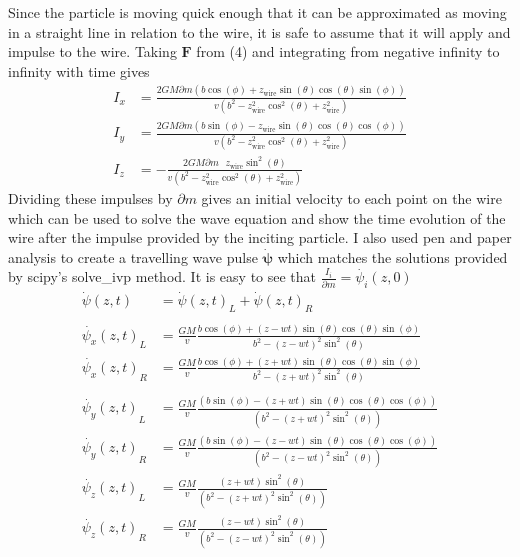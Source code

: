 \documentclass{report}
\begin{document}
Since the particle is moving quick enough that it can be approximated as moving in a straight line in relation
to the wire, it is safe to assume that it will apply and impulse to the wire. Taking $\mathbf{F}$ from (4) and 
integrating from negative infinity to infinity with time gives
\begin{align}
    I_x &= \frac{2 G M \partial m (b \cos (\phi )+z_{\text{wire}} \sin (\theta ) \cos (\theta ) \sin (\phi ))}{v \left(b^2-z_{\text{wire}}^2 \cos ^2(\theta )+z_{\text{wire}}^2\right)}\\
    I_y &= \frac{2 G M \partial m (b \sin (\phi )-z_{\text{wire}} \sin (\theta ) \cos (\theta ) \cos (\phi ))}{v \left(b^2-z_{\text{wire}}^2 \cos ^2(\theta )+z_{\text{wire}}^2\right)}\\
    I_z &= -\frac{2 G M \partial m \text{ } z_{\text{wire}} \sin ^2(\theta )}{v \left(b^2-z_{\text{wire}}^2 \cos ^2(\theta )+z_{\text{wire}}^2\right)}
\end{align}
Dividing these impulses by $\partial m$ gives an initial velocity to each point on the wire which can be used to 
solve the wave equation and show the time evolution of the wire after the impulse provided by the inciting particle.
I also used pen and paper analysis to create a travelling wave pulse $\dot{\mathbf{\psi}}$ which matches the solutions provided
by scipy's solve\_ivp method. It is easy to see that  $\frac{I_i}{\partial m} = \dot{\psi_i} (z, 0)$
\begin{align}
    \dot{\psi} (z, t) &= {\dot{\psi} (z, t)}_L + {\dot{\psi} (z, t)}_R\\
    \nonumber\\
    \nonumber {\dot{\psi_x} (z, t)}_L &= \frac{G M}{v} \frac{b \cos (\phi )+ (z - w t) \sin (\theta ) \cos (\theta ) \sin (\phi )}{b^2-{(z - w t)}^2 \sin ^2(\theta )}\\
    \nonumber {\dot{\psi_x} (z, t)}_R &= \frac{G M}{v} \frac{b \cos (\phi )+ (z + w t) \sin (\theta ) \cos (\theta ) \sin (\phi )}{b^2-{(z + w t)}^2 \sin ^2(\theta )}\\
    \nonumber\\
    \nonumber {\dot{\psi_y} (z, t)}_L &= \frac{G M}{v} \frac{(b \sin (\phi )-{(z + w t)} \sin (\theta ) \cos (\theta ) \cos (\phi ))}{\left(b^2-{(z + w t)}^2 \sin ^2(\theta )\right)}\\
    \nonumber {\dot{\psi_y} (z, t)}_R &= \frac{G M}{v} \frac{(b \sin (\phi )-{(z - w t)} \sin (\theta ) \cos (\theta ) \cos (\phi ))}{\left(b^2-{(z - w t)}^2 \sin ^2(\theta )\right)}
    \nonumber\\
    \nonumber {\dot{\psi_z} (z, t)}_L &= \frac{G M}{v} \frac{{(z + w t)} \sin ^2(\theta )}{\left(b^2-{(z + w t)}^2 \sin ^2(\theta )\right)}\\
    \nonumber {\dot{\psi_z} (z, t)}_R &= \frac{G M}{v} \frac{{(z - w t)} \sin ^2(\theta )}{\left(b^2-{(z - w t)}^2 \sin ^2(\theta )\right)}
\end{align}
\end{document}
